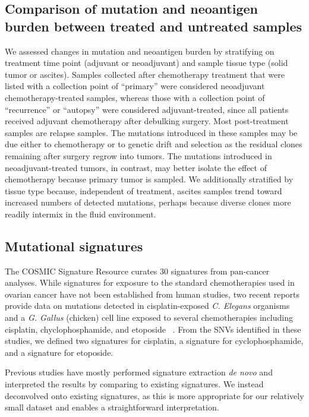 \subsection*{Comparison of mutation and neoantigen burden between treated and untreated samples}
We assessed changes in mutation and neoantigen burden by stratifying on treatment time point (adjuvant or neoadjuvant) and sample tissue type (solid tumor or ascites). Samples collected after chemotherapy treatment that were listed with a collection point of ``primary'' were considered neoadjuvant chemotherapy-treated samples, whereas those with a collection point of ``recurrence'' or ``autopsy'' were considered adjuvant-treated, since all patients received adjuvant chemotherapy after debulking surgery. Most post-treatment samples are relapse samples. The mutations introduced in these samples may be due either to chemotherapy or to genetic drift and selection as the residual clones remaining after surgery regrow into tumors. The mutations introduced in neoadjuvant-treated tumors, in contrast, may better isolate the effect of chemotherapy because primary tumor is sampled. We additionally stratified by tissue type because, independent of treatment, ascites samples trend toward increased numbers of detected mutations, perhaps because diverse clones more readily intermix in the fluid environment.

\subsection*{Mutational signatures}
The COSMIC Signature Resource curates 30 signatures from pan-cancer analyses. While signatures for exposure to the standard chemotherapies used in ovarian cancer have not been established from human studies, two recent reports provide data on mutations detected in cisplatin-exposed \textit{C. Elegans} organisms~\cite{Meier_2014} and a \textit{G. Gallus} (chicken) cell line exposed to several chemotherapies including cisplatin, chyclophosphamide, and etoposide ~\cite{Szikriszt_2016}. From the SNVs identified in these studies, we defined two signatures for cisplatin, a signature for cyclophosphamide, and a signature for etoposide.

Previous studies have mostly performed signature extraction \textit{de novo} and interpreted the results by comparing to existing signatures. We instead deconvolved onto existing signatures, as this is more appropriate for our relatively small dataset and enables a straightforward interpretation.

